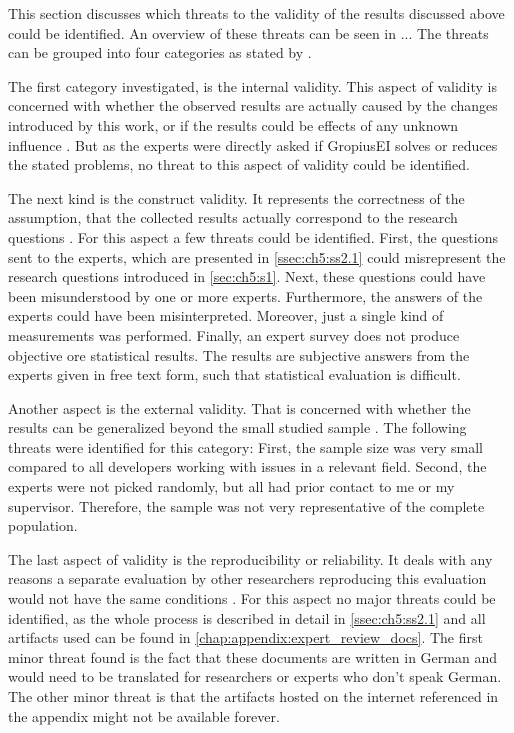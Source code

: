 This section discusses which threats to the validity of the results discussed above could be identified.
An overview of these threats can be seen in ...
The threats can be grouped into four categories as stated by \cite{runeson2009guidelines}.

The first category investigated, is the internal validity.
This aspect of validity is concerned with whether the observed results are actually caused by the changes introduced by this work,
or if the results could be effects of any unknown influence \cite{runeson2009guidelines}.
But as the experts were directly asked if \gls{GropiusEI} solves or reduces the stated problems, no threat to this aspect of validity could be identified.

The next kind is the construct validity.
It represents the correctness of the assumption, that the collected results actually correspond to the research questions \cite{runeson2009guidelines}.
For this aspect a few threats could be identified.
First, the questions sent to the experts, which are presented in \cref{ssec:ch5:ss2.1} could misrepresent the research questions 
introduced in \cref{sec:ch5:s1}.
Next, these questions could have been misunderstood by one or more experts.
Furthermore, the answers of the experts could have been misinterpreted.
Moreover, just a single kind of measurements was performed.
Finally, an expert survey does not produce objective ore statistical results.
The results are subjective answers from the experts given in free text form, such that statistical evaluation is difficult. 

Another aspect is the external validity.
That is concerned with whether the results can be generalized beyond the small studied sample \cite{runeson2009guidelines}.
The following threats were identified for this category:
First, the sample size was very small compared to all developers working with issues in a relevant field.
Second, the experts were not picked randomly, but all had prior contact to me or my supervisor.
Therefore, the sample was not very representative of the complete population.

The last aspect of validity is the reproducibility or reliability.
It deals with any reasons a separate evaluation by other researchers reproducing this evaluation would not have the same conditions \cite{runeson2009guidelines}.
For this aspect no major threats could be identified, as the whole process is described in detail in \cref{ssec:ch5:ss2.1} and all artifacts used can be found in \cref{chap:appendix:expert_review_docs}.
The first minor threat found is the fact that these documents are written in German and would need to be translated for researchers or experts who don't speak German.
The other minor threat is that the artifacts hosted on the internet referenced in the appendix might not be available forever.
